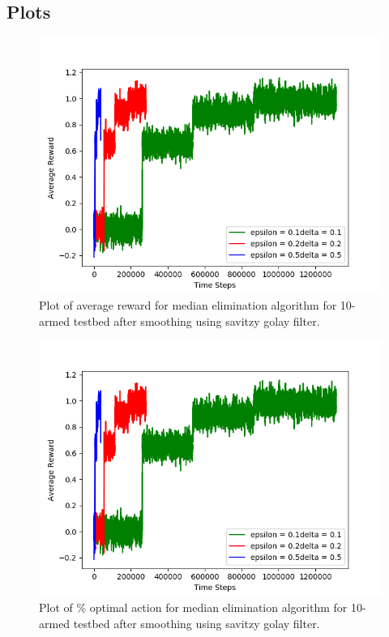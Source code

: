 \documentclass[english]{article}
\begin{document}
\subsection{Plots}
\begin{figure}[H]
    \centering
    \includegraphics[width=\linewidth]{mea_10arms.png}
    \caption{Plot of average reward for median elimination algorithm for 10-armed testbed after smoothing using savitzy golay filter.}
    \label{fig:eg1}
\end{figure}

\begin{figure}[H]
    \centering
    \includegraphics[width=\linewidth]{mea_10arms.png}
    \caption{Plot of \% optimal action for median elimination algorithm for 10-armed testbed after smoothing using savitzy golay filter.}
    \label{fig:eg1}
\end{figure}
\end{document}
